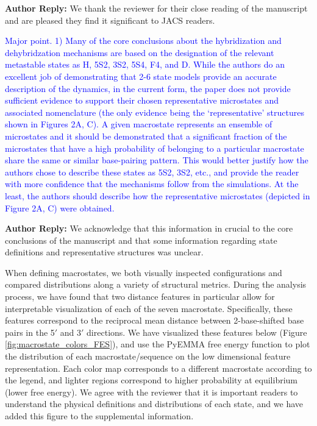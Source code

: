 \documentclass[11pt,a4paper]{letter} %
\begin{document}
\textbf{Author Reply:}   We thank the reviewer for their close reading of the manuscript and are pleased they find it significant to JACS readers.

\textcolor{blue}{Major point.
1)      Many of the core conclusions about the hybridization and dehybridzation mechanisms are based on the designation of the relevant metastable states as H, 5S2, 3S2, 5S4, F4, and D. While the authors do an excellent job of demonstrating that 2-6 state models provide an accurate description of the dynamics, in the current form, the paper does not provide sufficient evidence to support their chosen representative microstates and associated nomenclature (the only evidence being the ‘representative’ structures shown in Figures 2A, C). A given macrostate represents an ensemble of microstates and it should be demonstrated that a significant fraction of the microstates that have a high probability of belonging to a particular macrostate share the same or similar base-pairing pattern. This would better justify how the authors chose to describe these states as 5S2, 3S2, etc., and provide the reader with more confidence that the mechanisms follow from the simulations. At the least, the authors should describe how the representative microstates (depicted in Figure 2A, C) were obtained.
}

\textbf{Author Reply:}   We acknowledge that this information in crucial to the core conclusions of the manuscript and that some information regarding state definitions and representative structures was unclear.

When defining macrostates, we both visually inspected configurations and compared distributions along a variety of structural metrics.  During the analysis process, we have found that two distance features in particular allow for interpretable visualization of each of the seven macrostate. Specifically, these features correspond to the reciprocal mean distance between 2-base-shifted base pairs in the 5$\prime$ and 3$\prime$ directions. We have visualized these features below (Figure \ref{fig:macrostate_colors_FES}), and use the PyEMMA free energy function to plot the distribution of each macrostate/sequence on the low dimensional feature representation. Each color map corresponds to a different macrostate according to the legend, and lighter regions correspond to higher probability at equilibrium (lower free energy). We agree with the reviewer that it is important readers to understand the physical definitions and distributions of each state, and we have added this figure to the supplemental information.
\end{document}
